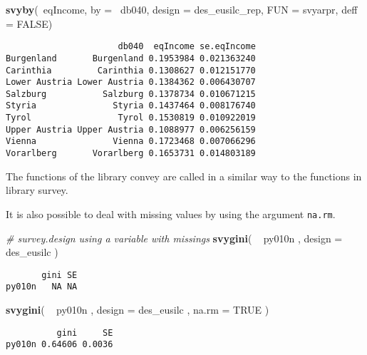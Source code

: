 \documentclass[]{book}
\newenvironment{Shaded}{\begin{snugshade}}{\end{snugshade}}
\newcommand{\KeywordTok}[1]{\textcolor[rgb]{0.13,0.29,0.53}{\textbf{{#1}}}}
\newcommand{\DataTypeTok}[1]{\textcolor[rgb]{0.13,0.29,0.53}{{#1}}}
\newcommand{\StringTok}[1]{\textcolor[rgb]{0.31,0.60,0.02}{{#1}}}
\newcommand{\CommentTok}[1]{\textcolor[rgb]{0.56,0.35,0.01}{\textit{{#1}}}}
\newcommand{\OtherTok}[1]{\textcolor[rgb]{0.56,0.35,0.01}{{#1}}}
\newcommand{\NormalTok}[1]{{#1}}
\begin{document}
\begin{Shaded}
\begin{Highlighting}[]
\KeywordTok{svyby}\NormalTok{(~eqIncome, }\DataTypeTok{by =} \NormalTok{~db040, }\DataTypeTok{design =} \NormalTok{des_eusilc_rep, }\DataTypeTok{FUN =} \NormalTok{svyarpr, }\DataTypeTok{deff =} \OtherTok{FALSE}\NormalTok{)}
\end{Highlighting}
\end{Shaded}

\begin{verbatim}
                      db040  eqIncome se.eqIncome
Burgenland       Burgenland 0.1953984 0.021363240
Carinthia         Carinthia 0.1308627 0.012151770
Lower Austria Lower Austria 0.1384362 0.006430707
Salzburg           Salzburg 0.1378734 0.010671215
Styria               Styria 0.1437464 0.008176740
Tyrol                 Tyrol 0.1530819 0.010922019
Upper Austria Upper Austria 0.1088977 0.006256159
Vienna               Vienna 0.1723468 0.007066296
Vorarlberg       Vorarlberg 0.1653731 0.014803189
\end{verbatim}

The functions of the library convey are called in a similar way to the
functions in library survey.

It is also possible to deal with missing values by using the argument
\texttt{na.rm}.

\begin{Shaded}
\begin{Highlighting}[]
\CommentTok{# survey.design using a variable with missings}
\KeywordTok{svygini}\NormalTok{( ~}\StringTok{ }\NormalTok{py010n , }\DataTypeTok{design =} \NormalTok{des_eusilc )}
\end{Highlighting}
\end{Shaded}

\begin{verbatim}
       gini SE
py010n   NA NA
\end{verbatim}

\begin{Shaded}
\begin{Highlighting}[]
\KeywordTok{svygini}\NormalTok{( ~}\StringTok{ }\NormalTok{py010n , }\DataTypeTok{design =} \NormalTok{des_eusilc , }\DataTypeTok{na.rm =} \OtherTok{TRUE} \NormalTok{)}
\end{Highlighting}
\end{Shaded}

\begin{verbatim}
          gini     SE
py010n 0.64606 0.0036
\end{verbatim}
\end{document}
